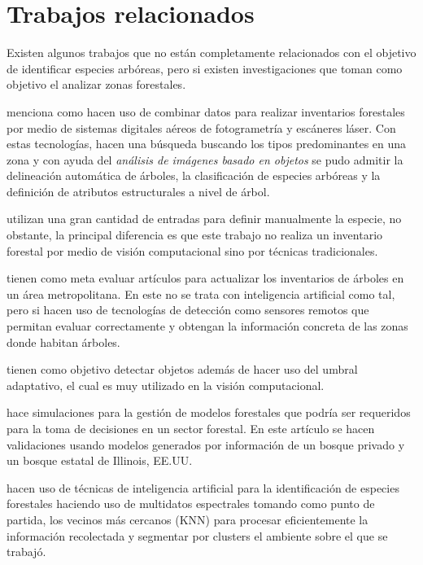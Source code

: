 \documentclass[review]{elsarticle}
\begin{document}
\section{Trabajos relacionados}
Existen algunos trabajos que no están completamente relacionados con el objetivo de identificar especies arbóreas, pero si existen investigaciones que toman como objetivo el analizar zonas forestales.

\citet{rf14} menciona como hacen uso de combinar datos para realizar inventarios forestales por medio de sistemas digitales aéreos de fotogrametría y escáneres láser. Con estas tecnologías, hacen una búsqueda buscando los tipos predominantes en una zona y con ayuda del \emph{análisis de imágenes basado en objetos} se pudo admitir la delineación automática de árboles, la clasificación de especies arbóreas y la definición de atributos estructurales a nivel de árbol. 
\newline
\break

\citet{rf1}  utilizan una gran cantidad de entradas para definir manualmente la especie, no obstante, la principal diferencia es que este trabajo no realiza un inventario forestal por medio de visión computacional sino por técnicas tradicionales.
 
\citet{rf2} tienen como meta evaluar artículos para actualizar los inventarios de árboles en un área metropolitana. En este no se trata con inteligencia artificial como tal, pero si hacen uso de tecnologías de detección como sensores remotos que permitan evaluar correctamente y obtengan la información concreta de las zonas donde habitan  árboles.

\citet{rf3} tienen como objetivo detectar objetos además de hacer uso del umbral adaptativo, el cual es muy utilizado en la visión computacional. %

\citet{rf9} hace simulaciones para la gestión de modelos forestales que podría ser requeridos para la toma de decisiones en un sector forestal. En este artículo se hacen validaciones usando modelos generados por información de un bosque privado y un bosque estatal de Illinois, EE.UU.

\citet{rf10} hacen uso de técnicas de inteligencia artificial para la identificación  de especies forestales haciendo uso de multidatos espectrales tomando como punto de partida, los vecinos más cercanos (KNN) para procesar eficientemente la información recolectada y segmentar por clusters el ambiente sobre el que se trabajó.
\end{document}
